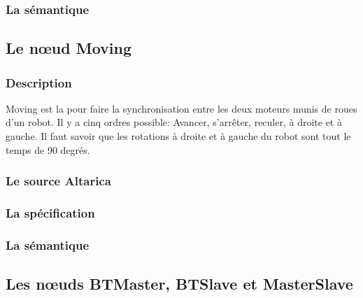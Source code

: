    \subsubsection{La sémantique}

  \subsection{Le n\oe{}ud Moving}

   \subsubsection{Description}
   Moving est la pour faire la synchronisation entre les deux moteurs
   munis de roues d'un robot. Il y a cinq ordres possible: Avancer,
   s'arrêter, reculer, à droite et à gauche. Il faut savoir que les
   rotations à droite et à gauche du robot sont tout le temps de 90
   degrés.

   \subsubsection{Le source Altarica}
   
   
   \subsubsection{La spécification}
   
 
   \subsubsection{La sémantique}

  \subsection{Les n\oe{}uds BTMaster, BTSlave et MasterSlave}
  
